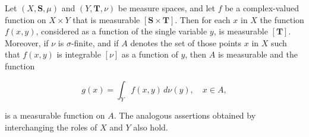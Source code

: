 Let $(X, \mathbf{S}, \mu)$ and $(Y, \mathbf{T}, \nu)$ be measure spaces, and let $f$ be a complex-valued function on $X \times Y$ that is measurable $[\mathbf{S} \times \mathbf{T}]$. Then for each $x$ in $X$ the function $f(x, y)$, considered as a function of the single variable $y$, is measurable $[\mathbf{T}]$. Moreover, if $\nu$ is $\sigma$-finite, and if $A$ denotes the set of those points $x$ in $X$ such that $f(x, y)$ is integrable $[\nu]$ as a function of $y$, then $A$ is measurable and the function

$$g(x) = \int_Y f(x, y) \, d\nu(y), \quad x \in A,$$

is a measurable function on $A$. The analogous assertions obtained by interchanging the roles of $X$ and $Y$ also hold.
